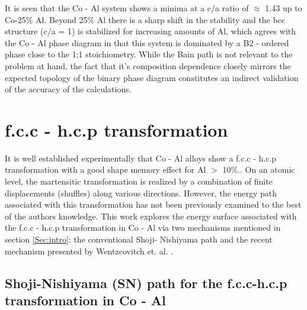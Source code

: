 \documentclass[preprint]{elsarticle}
\begin{document}
It is seen that the Co - Al system shows a minima  at a c/a ratio of $\approx$ 1.43 up to Co-25\% Al. Beyond 25\% Al there is a sharp shift in the stability and the bcc structure (c/a = 1) is stabilized for increasing amounts of Al, which agrees with the Co - Al phase diagram in that this system is dominated by a B2 - ordered phase close to the 1:1 stoichiometry. While the Bain path is not relevant to the problem at hand, the fact that it's composition dependence closely mirrors the expected topology of the binary phase diagram constitutes an indirect validation of the accuracy of the calculations.
 \section{f.c.c - h.c.p transformation}
\label{Sec:fcc_hcp}
It is well established experimentally that Co - Al alloys show a f.c.c - h.c.p transformation with a good shape memory effect for Al $>$ 10\%.\cite{omori2003}.
On an atomic level, the martensitic transformation is realized by a combination of finite displacements (shuffles) along various directions. 
However, the energy path associated with this transformation has not been previously examined to the best of the authors knowledge. This work explores the energy surface associated with the f.c.c - h.c.p transformation
in Co - Al via two mechanisms mentioned in section \ref{Sec:intro}: the conventional Shoji- Nishiyama path \cite{nishiyama1978} and the recent mechanism presented by Wentzcovitch et. al. \cite{wentzcovitch1991fcc}.

\subsection{Shoji-Nishiyama (SN) path for the f.c.c-h.c.p transformation in Co - Al}
\end{document}
